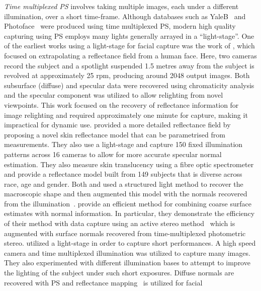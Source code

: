 \textit{Time multiplexed PS} involves taking multiple images, each under
a different illumination, over a short time-frame. Although databases such as
YaleB~\cite{georghiades2001fromfew} and Photoface~\cite{RefWorks:293} were produced
using time multiplexed PS, modern high quality capturing using PS employs
many lights generally arrayed in a ``light-stage''. One of the earliest works
using a light-stage for facial capture was the work of
\citet{debevec2000acquiring}, which focused on extrapolating a reflectance
field from a human face. Here, two cameras record the subject and a spotlight
suspended 1.5 metres away from the subject is revolved at approximately 25 rpm,
producing around 2048 output images. Both subsurface (diffuse) and specular data
were recovered using chromaticity analysis and the specular component was
utilized to allow relighting from novel viewpoints. This work focused on the
recovery of reflectance information for image relighting and required
approximately one minute for capture, making it impractical for dynamic use.
\citet{weyrich2006analysis} provided a more
detailed reflectance field by proposing a novel skin reflectance model
that can be parametrised from measurements. They also use a light-stage and
capture 150 fixed illumination patterns across 16 cameras to allow for more
accurate specular normal estimation. They also measure skin translucency
using a fibre optic spectrometer~\cite{nickell2000anisotropy} and provide
a reflectance model built from 149 subjects that is diverse across race, age and
gender. Both \citet{weyrich2006analysis} and \citet{debevec2000acquiring} used 
a structured light method to recover
the macroscopic shape and then augmented this model with the normals
recovered from the illumination~\cite{nehab2005efficiently}.
\cite{nehab2005efficiently} provide an efficient method for combining coarse 
surface estimates with normal information. In particular, they demonstrate the
efficiency of their method with data capture using an 
active stereo method~\cite{zhang2003spacetime,davis2005spacetime} which is
augmented with surface normals recovered from time-multiplexed photometric
stereo.
\citet{wenger2005performance} utilized a light-stage in order to capture
short performances. A high speed camera and time multiplexed illumination was
utilized to capture many images. They also experimented with different
illumination bases to attempt to improve the lighting of the subject
under such short exposures. Diffuse normals are recovered with PS and
reflectance mapping~\cite{miller1984illumination} is utilized for facial

